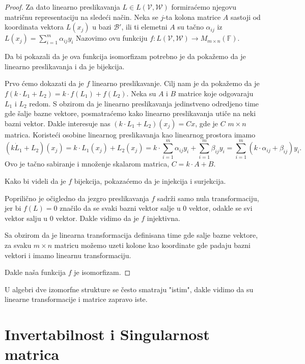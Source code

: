 \documentclass{article}
\begin{document}
\begin{proof}
  Za dato linearno preslikavanja $L \in L(\mathcal{V}, \mathcal{W})$ formiraćemo njegovu matričnu representaciju na sledeći način.
  Neka se $j$-ta kolona matrice $A$ sastoji od koordinata vektora $L(x_j)$ u bazi $\mathcal{B}'$, ili ti elemetni $A$ su tačno $\alpha_{ij}$ iz $L(x_j) = \sum_{i = 1}^{m} \alpha_{ij} y_i$
  Nazovimo ovu funkciju $f : L(\mathcal{V}, \mathcal{W}) \to M_{m \times n} (\mathbb{F})$.

  Da bi pokazali da je ova funkcija isomorfizam potrebno je da pokažemo da je linearno preslikavanja i da je bijekcija.
  
  Prvo ćemo dokazati da je $f$ linearno preslikavanje.
  Cilj nam je da pokažemo da je $f(k \cdot L_1 + L_2) = k \cdot f(L_1) + f(L_2)$.
  Neka su $A$ i $B$ matrice koje odgovaraju $L_1$ i $L_2$ redom.
  S obzirom da je linearno preslikavanja jedinstveno odredjeno time gde šalje bazne vektore, posmatraćemo kako linearno preslikavanja utiče na neki bazni vektor.
  Dakle interesuje nas $(k \cdot L_1 + L_2)(x_j) = Cx$, gde je $C$ $m \times n$ matrica.
  Koristeći osobine linearnog preslikavanja kao linearnog prostora imamo
  \[(k \dot L_1 + L_2)(x_j) = k \cdot L_1(x_j) + L_2(x_j) = k \cdot \sum_{i = 1}^{m} \alpha_{ij} y_i + \sum_{i = 1}^{m} \beta_{ij} y_i = \sum_{i = 1}^{m} (k \cdot \alpha_{ij} + \beta_{ij}) y_i.\]
  Ovo je tačno sabiranje i množenje skalarom matrica, $C = k \cdot A + B$.
  

  Kako bi videli da je $f$ bijekcija, pokazaćemo da je injekcija i surjekcija.

  Poprilično je očigledno da jezgro preslikavanja $f$ sadrži samo nula transformaciju, jer bi $f(L) = 0$ značilo da se svaki bazni vektor salje u $0$ vektor, odakle se svi vektor salju u $0$ vektor.
  Dakle vidimo da je $f$ injektivna.

  Sa obzirom da je linearna transformacija definisana time gde salje bazne vektore, za svaku $m \times n$ matricu možemo uzeti kolone kao koordinate gde padaju bazni vektori i imamo linearnu transformaciju.

  Dakle naša funkcija $f$ je isomorfizam.
\end{proof}

U algebri dve izomorfne strukture se često smatraju "istim", dakle vidimo da su linearne transformacije i matrice zapravo iste.

\section{Invertabilnost i Singularnost matrica}
\end{document}
